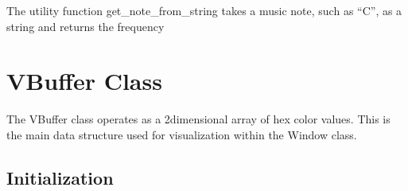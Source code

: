 \documentclass[letterpaper,10pt,english]{sphinxmanual}
\begin{document}
\sphinxAtStartPar
The utility function get\_note\_from\_string takes a music note, such as “C”, as a string and returns the frequency
\def\sphinxLiteralBlockLabel{\label{\detokenize{fundamentals:id4}}}
\begin{sphinxVerbatim}[commandchars=\\\{\}]
   
    
   

  
\end{sphinxVerbatim}


\chapter{VBuffer Class}
\label{\detokenize{fundamentals:vbuffer-class}}
\sphinxAtStartPar
The VBuffer class operates as a 2\sphinxhyphen{}dimensional array of hex color values. This is the main data structure used for visualization within the Window class.


\section{Initialization}
\label{\detokenize{fundamentals:initialization}}
\def\sphinxLiteralBlockLabel{\label{\detokenize{fundamentals:id5}}}
\begin{sphinxVerbatim}[commandchars=\\\{\}]
   
\end{sphinxVerbatim}
\def\sphinxLiteralBlockLabel{\label{\detokenize{fundamentals:id6}}}
\begin{sphinxVerbatim}[commandchars=\\\{\}]
   
   
\end{sphinxVerbatim}
\def\sphinxLiteralBlockLabel{\label{\detokenize{fundamentals:id7}}}
\begin{sphinxVerbatim}[commandchars=\\\{\}]
   
\end{sphinxVerbatim}
\end{document}
